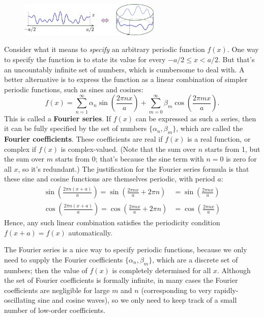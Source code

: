 \documentclass[10pt,a4paper]{article}
\begin{document}
\begin{figure}[h]
  \centering\includegraphics[width=0.6\textwidth]{periodic_function}
\end{figure}

Consider what it means to \emph{specify} an arbitrary periodic
function $f(x)$. One way to specify the function is to state its value
for every $-a/2 \le x < a/2$. But that's an uncountably infinite set
of numbers, which is cumbersome to deal with. A better alternative is
to express the function as a linear combination of simpler periodic
functions, such as sines and cosines:
\begin{equation}
  f(x) = \sum_{n=1}^\infty \alpha_n \sin\left(\frac{2\pi n x}{a}\right) + \sum_{m=0}^\infty \beta_m \cos\left(\frac{2 \pi m x}{a}\right).
\end{equation}
This is called a \textbf{Fourier series}. If $f(x)$ can be expressed
as such a series, then it can be fully specified by the set of numbers
$\{\alpha_n, \beta_m\}$, which are called the \textbf{Fourier
  coefficients}. These coefficients are real if $f(x)$ is a real
function, or complex if $f(x)$ is complex-valued. (Note that the sum
over $n$ starts from 1, but the sum over $m$ starts from 0; that's
because the sine term with $n = 0$ is zero for all $x$, so it's
redundant.) The justification for the Fourier series formula is that
these sine and cosine functions are themselves periodic, with period
$a$:
\begin{align}
  \sin\left(\frac{2\pi n (x+a)}{a}\right) = \sin\left(\frac{2\pi n x}{a} + 2\pi n\right) &= \sin\left(\frac{2\pi n x}{a}\right)
  \\ \cos\left(\frac{2\pi n (x+a)}{a}\right) = \cos\left(\frac{2\pi n x}{a} + 2\pi n\right) &= \cos\left(\frac{2\pi n x}{a}\right)
\end{align}
Hence, any such linear combination satisfies the periodicity condition
$f(x+a) = f(x)$ automatically.

The Fourier series is a nice way to specify periodic functions,
because we only need to supply the Fourier coefficients $\{\alpha_n,
\beta_m\}$, which are a discrete set of numbers; then the value of
$f(x)$ is completely determined for all $x$. Although the set of
Fourier coefficients is formally infinite, in many cases the Fourier
coefficients are negligible for large $m$ and $n$ (corresponding to
very rapidly-oscillating sine and cosine waves), so we only need to
keep track of a small number of low-order coefficients.
\end{document}
